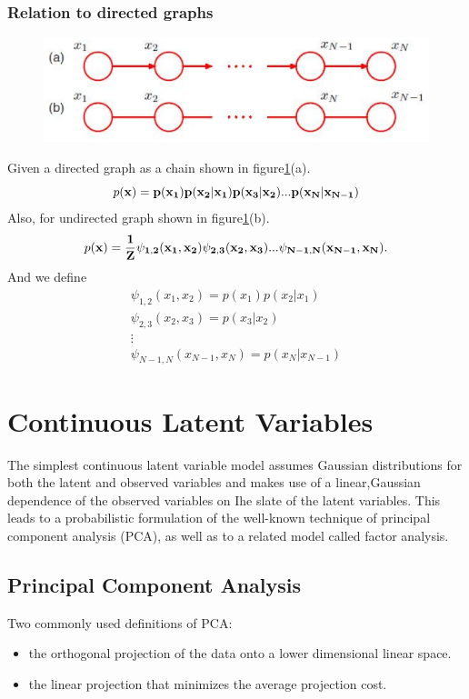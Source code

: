 \documentclass[a4paper]{book}
\begin{document}
\subsubsection{Relation to directed graphs}
\begin{figure}
  \centering
  \includegraphics[width=\textwidth]{./imgs/GM3.eps}
  \caption{}\label{GM3}
\end{figure}
Given a directed graph as a chain shown in figure\ref{GM3}(a).
\begin{equation}\label{eq8.14}
  p(\bf x) =p(x_1)p(x_2|x_1)p(x_3|x_2)...p(x_N|x_{N-1})
\end{equation}
Also, for undirected graph shown in figure\ref{GM3}(b).
\begin{equation}\label{eq8.15}
  p(\bf x) = \frac{1}{Z}\psi_{1,2}(x_1,x_2)\psi_{2,3}(x_2,x_3)...\psi_{N-1,N}(x_{N-1},x_N).
\end{equation}
And we define
\begin{align}\label{eq8.15}
  \psi_{1,2}(x_1,x_2) = p(x_1)p(x_2|x_1) \\
  \psi_{2,3}(x_2,x_3)=p(x_3|x_2) \\
  \vdots \\
  \psi_{N-1,N}(x_{N-1},x_N) = p(x_N|x_{N-1})
\end{align}

\section{Continuous Latent Variables}
The simplest continuous latent variable model assumes Gaussian distributions
for both the latent and observed variables and makes use of a linear,Gaussian dependence of the observed variables on Ihe slate of the latent variables. This leads
to a probabilistic formulation of the well-known technique of principal component
analysis (PCA), as well as to a related model called factor analysis.
\subsection{Principal Component Analysis}
Two commonly used definitions of PCA:
\begin{itemize}
  \item the orthogonal projection of the data onto a lower dimensional linear space.
  \item the linear projection that minimizes the average projection cost.
\end{itemize}
\end{document}
